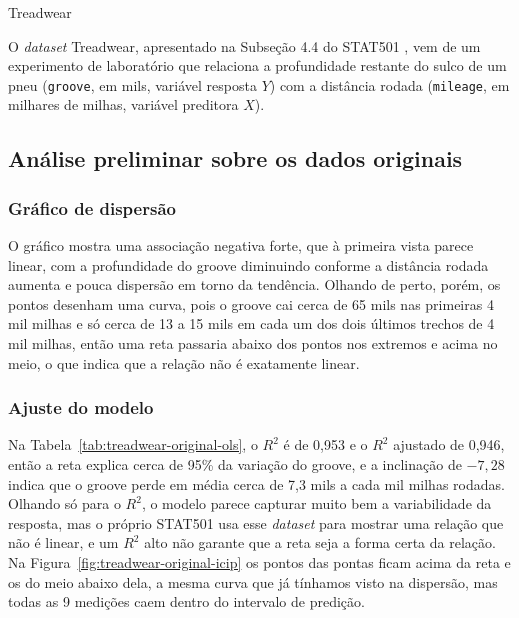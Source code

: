 

\begin{dataset}{Treadwear}

O \textit{dataset} Treadwear, apresentado na Subseção 4.4 do STAT501 \cite{stat501}, vem de um experimento de laboratório que relaciona a profundidade restante do sulco de um pneu (\texttt{groove}, em mils, variável resposta $Y$) com a distância rodada (\texttt{mileage}, em milhares de milhas, variável preditora $X$).

\subsection{Análise preliminar sobre os dados originais}

\subsubsection{Gráfico de dispersão}


O gráfico mostra uma associação negativa forte, que à primeira vista parece linear, com a profundidade do groove diminuindo conforme a distância rodada aumenta e pouca dispersão em torno da tendência. Olhando de perto, porém, os pontos desenham uma curva, pois o groove cai cerca de 65 mils nas primeiras 4 mil milhas e só cerca de 13 a 15 mils em cada um dos dois últimos trechos de 4 mil milhas, então uma reta passaria abaixo dos pontos nos extremos e acima no meio, o que indica que a relação não é exatamente linear.

\subsubsection{Ajuste do modelo}


Na Tabela~\ref{tab:treadwear-original-ols}, o $R^2$ é de 0,953 e o $R^2$ ajustado de 0,946, então a reta explica cerca de 95\% da variação do groove, e a inclinação de $-7{,}28$ indica que o groove perde em média cerca de 7,3 mils a cada mil milhas rodadas. Olhando só para o $R^2$, o modelo parece capturar muito bem a variabilidade da resposta, mas o próprio STAT501 usa esse \textit{dataset} para mostrar uma relação que não é linear, e um $R^2$ alto não garante que a reta seja a forma certa da relação. Na Figura~\ref{fig:treadwear-original-icip} os pontos das pontas ficam acima da reta e os do meio abaixo dela, a mesma curva que já tínhamos visto na dispersão, mas todas as 9 medições caem dentro do intervalo de predição.


\end{dataset}
